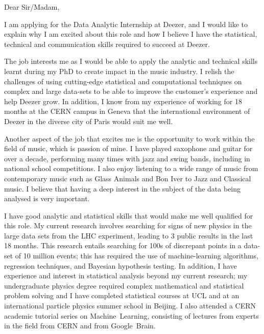 \documentclass[]{letter}
\begin{document}

\begin{letter}{}  %
  \address{ %
    123 Tyers Street,\\
    London,\\
    SE11 5HS, UK\\
    \vspace{-2em}
  }
  \signature{\vspace{-1.2cm}Laurie McClymont}
  \vspace{-2mm}
  \opening{Dear Sir/Madam,}
  \vspace{1mm}

I am applying for the Data Analytic Internship at Deezer, and I would like to explain why I am excited about this role and
how I believe I have the statistical, technical and communication skills required to succeed at Deezer.

The job interests me as I would be able to apply the analytic and technical skills learnt during my PhD
to create impact in the music industry.
I relish the challenges of using cutting-edge statistical and computational techniques on complex and large data-sets
to be able to improve the customer's experience and help Deezer grow.
In addition, I know from my experience of working for 18 months at the CERN campus in Geneva
that the international environment of Deezer in the diverse city of Paris would suit me well.

Another aspect of the job that excites me is the opportunity to work within the field of music, which is passion of mine.
I have played saxophone and guitar for over a decade, performing many times with jazz and swing bands, including in national school competitions.
I also enjoy listening to a wide range of music from contemporary music such as Glass Animals and Bon Iver to Jazz and Classical music.
I believe that having a deep interest in the subject of the data being analysed is very important.

I have good analytic and statistical skills that would make me well qualified for this role.
My current research involves searching for signs of new physics in the large data sets from the LHC experiment,
leading to 3 public results in the last 18 months.
This research entails searching for 100s of discrepant points in a data-set of 10 million events;
this has required the use of machine-learning algorithms, regression techniques, and  Bayesian hypothesis testing.
In addition, I have experience and interest in statistical analysis beyond my current research;
my undergraduate physics degree required complex mathematical and statistical problem solving
and I have completed statistical courses at UCL and at an international particle physics summer school in Beijing.
I also attended a CERN academic tutorial series on Machine~Learning,
consisting of lectures from experts in the field from CERN and from Google~Brain.


\end{letter}
\end{document}
